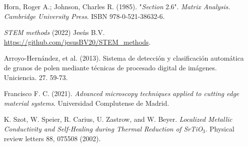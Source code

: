 \begin{thebibliography}{9}
Horn, Roger A.; Johnson, Charles R. (1985). "\textit{Section} 2.6". \textit{Matrix Analysis. Cambridge University Press}. ISBN 978-0-521-38632-6.

\textit{STEM methods} (2022) Jesús B.V. \url{https://github.com/jesusBV20/STEM_methods}.

Arroyo-Hernández, et al. (2013). Sistema de detección y clasificación automática de granos de polen mediante técnicas de procesado digital de imágenes. Uniciencia. 27. 59-73. 

Francisco F. C. (2021). \textit{Advanced microscopy techniques applied to cutting edge material systems}. Universidad Complutense de Madrid.

K. Szot, W. Speier, R. Carius, U. Zastrow, and W. Beyer. \textit{Localized Metallic Conductivity and 
Self-Healing during Thermal Reduction of SrTiO$_3$}. Physical review letters 88, 075508 (2002).

\end{thebibliography}


